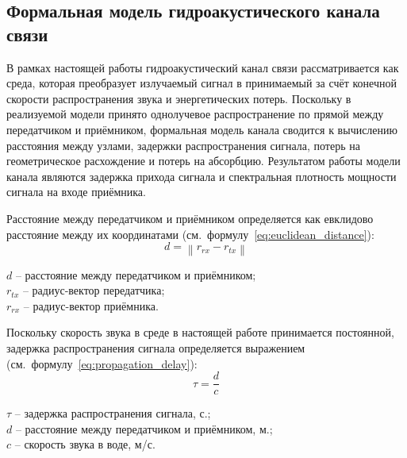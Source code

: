 \documentclass[
    numbers=section,
    document-code={ВКРБ--09.03.04--10.19--XX--26--81}
]{../latex/fqw}
\begin{document}
    \subsection{Формальная модель гидроакустического канала связи}
    \label{subsec:Formal_model_of_hydroacoustic_communication_channel}

    В рамках настоящей работы гидроакустический канал связи рассматривается как среда,
    которая преобразует излучаемый сигнал в принимаемый за счёт
    конечной скорости распространения звука и
    энергетических потерь.
    Поскольку в реализуемой модели принято однолучевое распространение по прямой между передатчиком и приёмником,
    формальная модель канала сводится к вычислению
    расстояния между узлами,
    задержки распространения сигнала,
    потерь на геометрическое расхождение и потерь на абсорбцию.
    Результатом работы модели канала являются
    задержка прихода сигнала и
    спектральная плотность мощности сигнала на входе приёмника.

    Расстояние между передатчиком и приёмником определяется как евклидово
    расстояние между их координатами (см.~формулу~\eqref{eq:euclidean_distance}):
    \begin{equation}
        d = \left\| r_{rx} - r_{tx} \right\|
        \label{eq:euclidean_distance}
    \end{equation}
    \begin{FqwWhere}
        \(d\) -- расстояние между передатчиком и приёмником;\\
        \(r_{tx}\) -- радиус-вектор передатчика;\\
        \(r_{rx}\) -- радиус-вектор приёмника.
    \end{FqwWhere}

    Поскольку скорость звука в среде в настоящей работе принимается постоянной,
    задержка распространения сигнала определяется выражением (см.~формулу~\eqref{eq:propagation_delay}):
    \begin{equation}
        \tau = \frac{d}{c}
        \label{eq:propagation_delay}
    \end{equation}
    \begin{FqwWhere}
        \(\tau\) -- задержка распространения сигнала, с.;\\
        \(d\) -- расстояние между передатчиком и приёмником, м.;\\
        \(c\) -- скорость звука в воде, м/с.
    \end{FqwWhere}
\end{document}
